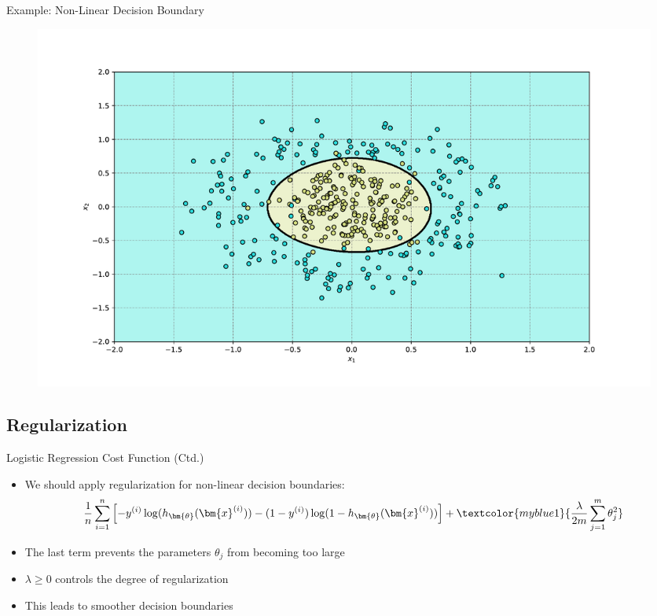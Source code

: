 \begin{frame}{Example: Non-Linear Decision Boundary}{}
	\vspace*{-2mm}
	\begin{figure}
		\includegraphics[scale=0.325]{07_logistic_regression/02_img/logreg_example_non_linear_boundary}
	\end{figure}
\end{frame}


\subsection{Regularization}

\begin{frame}{Logistic Regression Cost Function (Ctd.)}{}
	\begin{itemize}
		\item We should apply regularization for non-linear decision boundaries:
		\footnotesize
		\begin{equation}
			\frac{1}{n} \sum_{i=1}^n \left[
				-y^{(i)} \log(h_{\bm{\theta}}(\bm{x}^{(i)})) - (1 - y^{(i)}) \log(1 - h_{\bm{\theta}}(\bm{x}^{(i)}))
			\right] + \textcolor{myblue1}{\frac{\lambda}{2m} \sum_{j=1}^m \theta_j^2}
		\end{equation}
		\normalsize
		\item The last term prevents the parameters $\theta_j$ from becoming too large
		\item $\lambda \ge 0$ controls the degree of regularization
		\item This leads to smoother decision boundaries
	\end{itemize}
\end{frame}


